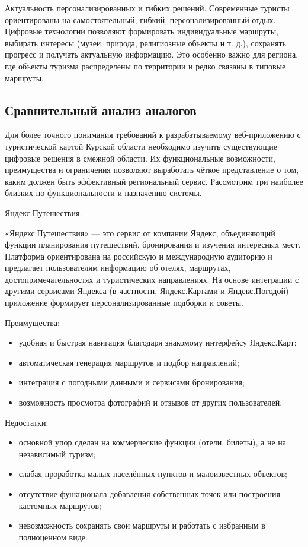 Актуальность персонализированных и гибких решений.
Современные туристы ориентированы на самостоятельный, гибкий, персонализированный отдых. Цифровые технологии позволяют формировать индивидуальные маршруты, выбирать интересы (музеи, природа, религиозные объекты и т. д.), сохранять прогресс и получать актуальную информацию. Это особенно важно для региона, где объекты туризма распределены по территории и редко связаны в типовые маршруты.

\subsection{Сравнительный анализ аналогов}

Для более точного понимания требований к разрабатываемому веб-приложению с туристической картой Курской области необходимо изучить существующие цифровые решения в смежной области. Их функциональные возможности, преимущества и ограничения позволяют выработать чёткое представление о том, каким должен быть эффективный региональный сервис. Рассмотрим три наиболее близких по функциональности и назначению системы.

Яндекс.Путешествия.

«Яндекс.Путешествия» — это сервис от компании Яндекс, объединяющий функции планирования путешествий, бронирования и изучения интересных мест. Платформа ориентирована на российскую и международную аудиторию и предлагает пользователям информацию об отелях, маршрутах, достопримечательностях и туристических направлениях. На основе интеграции с другими сервисами Яндекса (в частности, Яндекс.Картами и Яндекс.Погодой) приложение формирует персонализированные подборки и советы.

Преимущества:
\begin{itemize}
	\item удобная и быстрая навигация благодаря знакомому интерфейсу Яндекс.Карт;
	\item автоматическая генерация маршрутов и подбор направлений;
	\item интеграция с погодными данными и сервисами бронирования;
	\item возможность просмотра фотографий и отзывов от других пользователей.
\end{itemize}

Недостатки:
\begin{itemize}
	\item основной упор сделан на коммерческие функции (отели, билеты), а не на независимый туризм;
	\item слабая проработка малых населённых пунктов и малоизвестных объектов;
	\item отсутствие функционала добавления собственных точек или построения кастомных маршрутов;
	\item невозможность сохранять свои маршруты и работать с избранным в полноценном виде.
\end{itemize}

